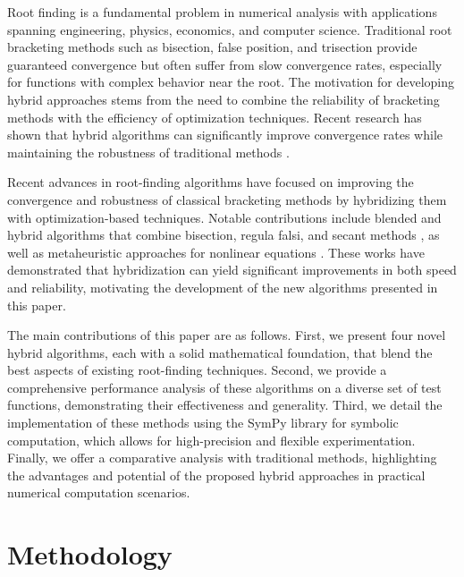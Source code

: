 \documentclass[amsmath, amssymb, aps]{revtex4-2}
\begin{document}
Root finding is a fundamental problem in numerical analysis with applications spanning engineering, physics, economics, and computer science. Traditional root bracketing methods such as bisection, false position, and trisection provide guaranteed convergence but often suffer from slow convergence rates, especially for functions with complex behavior near the root. The motivation for developing hybrid approaches stems from the need to combine the reliability of bracketing methods with the efficiency of optimization techniques. Recent research has shown that hybrid algorithms can significantly improve convergence rates while maintaining the robustness of traditional methods \cite{sabharwal2019blended, badr2022novel}.

Recent advances in root-finding algorithms have focused on improving the convergence and robustness of classical bracketing methods by hybridizing them with optimization-based techniques. Notable contributions include blended and hybrid algorithms that combine bisection, regula falsi, and secant methods \cite{sabharwal2019hybrid, badr2021comparative}, as well as metaheuristic approaches for nonlinear equations \cite{thota2019trigonometrical, hasan2016numerical}. These works have demonstrated that hybridization can yield significant improvements in both speed and reliability, motivating the development of the new algorithms presented in this paper.

The main contributions of this paper are as follows. First, we present four novel hybrid algorithms, each with a solid mathematical foundation, that blend the best aspects of existing root-finding techniques. Second, we provide a comprehensive performance analysis of these algorithms on a diverse set of test functions, demonstrating their effectiveness and generality. Third, we detail the implementation of these methods using the SymPy library for symbolic computation, which allows for high-precision and flexible experimentation. Finally, we offer a comparative analysis with traditional methods, highlighting the advantages and potential of the proposed hybrid approaches in practical numerical computation scenarios.

\section{Methodology}
\end{document}
